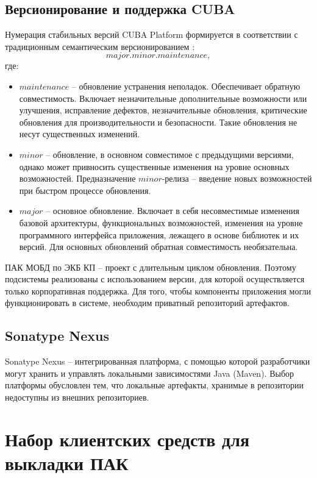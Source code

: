 \subsection{Версионирование и поддержка CUBA}

Нумерация стабильных версий CUBA Platform формируется в соответствии с традиционным семантическим версионированием \cite{cuba-ver}:
\begin{equation*}
	major.minor.maintenance,
\end{equation*}
где:
\begin{itemize}
	\item  $maintenance$ -- обновление устранения неполадок. Обеспечивает обратную совместимость. Включает незначительные дополнительные возможности или улучшения, исправление дефектов, незначительные обновления, критические обновления для производительности и безопасности. Такие обновления не несут существенных изменений.
	\item $minor$ --  обновление, в основном совместимое с предыдущими версиями, однако может привносить существенные изменения на уровне основных возможностей. Предназначение $minor$-релиза -- введение новых возможностей при быстром процессе обновления.
	\item $major$ -- основное обновление. Включает в себя несовместимые изменения базовой архитектуры, функциональных возможностей, изменения на уровне программного интерфейса приложения, лежащего в основе библиотек и их версий. Для основных обновлений обратная совместимость необязательна.
\end{itemize}
ПАК МОБД по ЭКБ КП -- проект с длительным циклом обновления. Поэтому подсистемы реализованы с использованием версии, для которой осуществляется только корпоративная поддержка. Для того, чтобы компоненты приложения могли функционировать в системе, необходим приватный репозиторий артефактов.

\subsection{Sonatype Nexus}
Sonatype Nexus -- интегрированная платформа, с помощью которой разработчики могут хранить и управлять локальными зависимостями Java (Maven). Выбор платформы обусловлен тем, что локальные артефакты, хранимые в репозитории недоступны из внешних репозиториев.

\section{Набор клиентских средств для выкладки ПАК}


